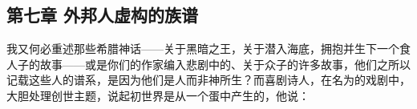 
\subsection{第七章 外邦人虚构的族谱}

我又何必重述那些希腊神话——关于黑暗之王，关于潜入海底，拥抱并生下一个食人子的故事——或是你们的作家编入悲剧中的、关于众子的许多故事，他们之所以记载这些人的谱系，是因为他们是人而非神所生？而喜剧诗人，在名为的戏剧中，大胆处理创世主题，说起初世界是从一个蛋中产生的，他说：\par

\par

